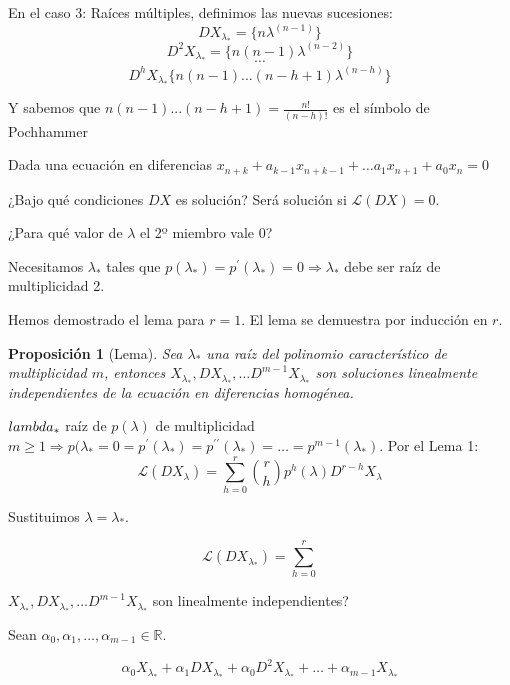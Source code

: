 \documentclass[11pt, a4paper]{article}
\makeatletter
\newif\IfInSansMode
\let\oldsf\sffamily
\renewcommand*{\sffamily}{\oldsf\mathversion{sans}\InSansModetrue}
\let\oldnorm\normalfont
\renewcommand*{\normalfont}{\oldnorm\InSansModefalse\mathversion{normal}}
\renewenvironment{proof}[1][\proofname] {\vspace{-15pt}\par\pushQED{\qed}\normalfont\topsep6\p@\@plus6\p@\relax\trivlist\item[\hskip\labelsep\it#1\@addpunct{.}]\ignorespaces}{\popQED\endtrivlist\@endpefalse}
\numberwithin{equation}{section}
\newcommand{\R}{\mathbb{R}}
\renewenvironment{proof}[1][\proofname] {\par\pushQED{\qed}\normalfont\topsep6\p@\@plus6\p@\relax\trivlist\item[\hskip\labelsep\itshape\sffamily#1\@addpunct{.}]\ignorespaces}{\popQED\endtrivlist\@endpefalse}
\theoremstyle{theorem-style}
\newtheorem{nprop}{Proposición}[section]
\theoremstyle{definition-style}
\theoremstyle{remark-style}
\theoremstyle{example-style}
\makeatother
\begin{document}
      En el caso 3: Raíces múltiples, definimos las nuevas sucesiones:
$$ DX_{\lambda_*} =\{n\lambda^{(n-1)}\}$$
$$ D^2X_{\lambda_*}= \{n(n-1)\lambda^{(n-2)}\} $$
$$ \cdots $$
$$ D^hX_{\lambda_*}\{n(n-1)...(n-h+1)\lambda^{(n-h)}\}$$

Y sabemos que $n(n-1)...(n-h+1) = \frac{n!}{(n-h)!}$ es el símbolo de Pochhammer

Dada una ecuación en diferencias
$x_{n+k} + a_{k-1}x_{n+k-1} + \hdots a _1x_{n+1} + a_0x_n = 0$



¿Bajo qué condiciones $DX$ es solución? Será solución si $\mathcal{L}(DX) = 0$.

¿Para qué valor de $\lambda$ el 2º miembro vale 0?

Necesitamos $\lambda_{\ast}$ tales que
$p(\lambda_{\ast}) = p^{\prime}(\lambda_{\ast}) = 0 \Rightarrow \lambda_{\ast}$
debe ser raíz de multiplicidad 2.

Hemos demostrado el lema para $r = 1$. El lema se demuestra por inducción en
$r$.

\begin{nprop}[Lema]
  Sea $\lambda_{\ast}$ una raíz del polinomio característico de multiplicidad
  $m$, entonces
  $X_{\lambda_{\ast}}, DX_{\lambda_{\ast}}, \hdots D^{m-1}X_{\lambda_{\ast}}$
  son soluciones linealmente independientes de la ecuación en diferencias
  homogénea.
\end{nprop}

\begin{proof}
  $\\lambda_{\ast}$ raíz de $p(\lambda)$ de multiplicidad
  $m \geq 1 \Rightarrow p(\lambda_{\ast} = 0 = p^{\prime}(\lambda_{\ast}) =
  p^{\prime \prime}(\lambda_{\ast}) = \hdots = p^{m-1}(\lambda_{\ast})$. Por el
  Lema 1:
	$$ \mathcal{L}(DX_{\lambda}) = \sum_{h = 0}^r \binom{r}{h}p^h(\lambda)D^{r-h}X_{\lambda}$$
	
	Sustituimos $\lambda = \lambda_{\ast}$.
	
	$$\mathcal{L}(DX_{\lambda_{\ast}}) = \sum_{h = 0}^{r}$$
	
	$X_{\lambda_{\ast}}, DX_{\lambda_{\ast}}, \hdots
        D^{m-1}X_{\lambda_{\ast}}$ son linealmente independientes?
	
	Sean $\alpha_0, \alpha_1, \hdots, \alpha_{m-1} \in \R$.
	
	$$\alpha_0X_{\lambda_{\ast}} + \alpha_1DX_{\lambda_{\ast}} + \alpha_0D^2X_{\lambda_{\ast}} + \hdots + \alpha_{m-1}X_{\lambda_{\ast}}$$
	
	
      \end{proof}
\end{document}
